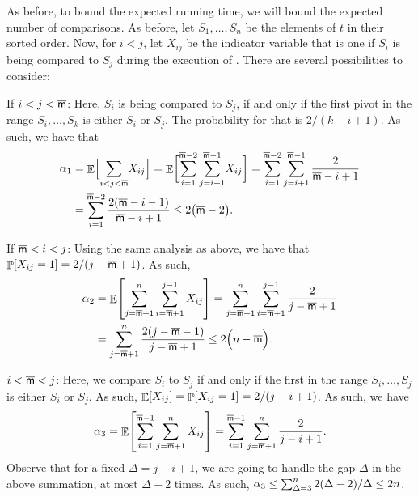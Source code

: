 As before, to bound the expected running time, we will bound the
expected number of comparisons. As before, let $S_1, \ldots, S_n$ be
the elements of $t$ in their sorted order.  Now, for $i < j$, let
$X_{ij}$ be the indicator variable that is one if $S_i$ is being
compared to $S_j$ during the execution of \QuickSelect. There are
several possibilities to consider:
\begin{compactenumi}
    \item If $i < j < \overline{\mathsf{m}}$: Here, $S_i$ is being compared to
    $S_j$, if and only if the first pivot in the range $S_i, \ldots,
    S_k$ is either $S_i$ or $S_j$.  The probability for that is
    $2/(k-i+1)$. As such, we have that
    \begin{align*}
      \alpha_1%
      &=%
        \Ex{\smash{\sum_{i< j <\median}} X_{ij}\Bigr.}%
        =
        \Ex{\biggl. \smash{\sum_{i=1}^{\median-2} \sum_{j=i+1}^{\median-1}} X_{ij}}%
        =%
        \sum_{i=1}^{\median-2} \sum_{j=i+1}^{\median-1}
        \frac{2}{\median-i+1}\\
        &=%
        \sum_{i=1}^{\median-2} \frac{2(\median-i-1)}{\median-i+1}%
        \leq%
        2\pth{\bigl. \median-2}.
    \end{align*}
    
    \item If $\overline{\mathsf{m}} < i < j$: Using the same analysis as above, we
    have that $\Prob{X_{ij}=1} = 2/(j-\median+1)$. As such,
    \begin{align*}
        \alpha_2
        &= \Ex{\sum_{j=\median+1}^n \sum_{i=\median+1}^{j-1}
           X_{ij}}%
        =%
        \sum_{j=\median+1}^n \sum_{i=\median+1}^{j-1}
        \frac{2}{j-\median+1}\\
        &=%
        \sum_{j=\median+1}^n \frac{2 (j-\median-1)}{j-\median+1}%
        \leq%
        2 \pth[]{\Bigl. n-\median}.
    \end{align*}
    
    \item $i < \overline{\mathsf{m}} < j$: Here, we compare $S_i$ to $S_j$ if and
    only if the first   in the range $S_i, \ldots, S_j$ is
    either $S_i$ or $S_j$. As such, $\Ex{ X_{ij} } = \Prob{X_{ij}=1} =
    2/(j-i+1)$.  As such, we have
    \begin{align*}
        \alpha_3= \mathop{\mathbb{E}}\!\left[ {\sum_{i=1}^{\overline{\mathsf{m}}-1} \sum_{j=\overline{\mathsf{m}}+1}^n
           X_{ij}} \right] = \sum_{i=1}^{\overline{\mathsf{m}}-1} \sum_{j=\overline{\mathsf{m}}+1}^n
        \frac{2}{j-i+1}.
    \end{align*}
    Observe that for a fixed $\Delta = j-i+1$, we are going to handle
    the gap $\Delta$ in the above summation, at most $\Delta-2$
    times. As such, $\alpha_3 \leq \sum_{\Delta=3}^{n} {2
       (\Delta-2)}/{\Delta} \leq 2 n$.
    

\end{compactenumi}

